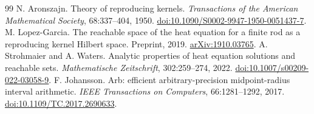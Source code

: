 \documentclass[11pt]{article}
\begin{document}
\begin{thebibliography}{99}
 N. Aronszajn. Theory of reproducing kernels. \emph{Transactions of the American Mathematical Society}, 68:337--404, 1950. \href{https://doi.org/10.1090/S0002-9947-1950-0051437-7}{doi:10.1090/S0002-9947-1950-0051437-7}.
 M. Lopez-Garcia. The reachable space of the heat equation for a finite rod as a reproducing kernel Hilbert space. Preprint, 2019. \href{https://arxiv.org/abs/1910.03765}{arXiv:1910.03765}.
 A. Strohmaier and A. Waters. Analytic properties of heat equation solutions and reachable sets. \emph{Mathematische Zeitschrift}, 302:259--274, 2022. \href{https://doi.org/10.1007/s00209-022-03058-9}{doi:10.1007/s00209-022-03058-9}.
 F. Johansson. Arb: efficient arbitrary-precision midpoint-radius interval arithmetic. \emph{IEEE Transactions on Computers}, 66:1281--1292, 2017. \href{https://doi.org/10.1109/TC.2017.2690633}{doi:10.1109/TC.2017.2690633}.
\end{thebibliography}
\end{document}
